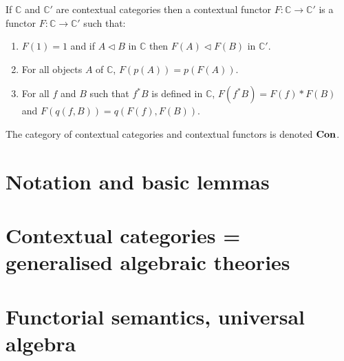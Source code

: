 \begin{definition}
  If \(\mathbb C\) and \(\mathbb C'\) are contextual categories then a contextual functor \(F:\mathbb C \rightarrow \mathbb C'\) is a functor \(F:\mathbb C \rightarrow \mathbb C'\) such that:
  \begin{enumerate}
  \item \(F(1) = 1\) and if \(A \triangleleft B\) in \(\mathbb C\) then \(F(A) \triangleleft F(B)\) in \(\mathbb C'\).
   
  \item For all objects \(A\) of \(\mathbb C\), \(F(p(A)) = p(F(A))\).
   
  \item For all \(f\) and \(B\) such that \(f^*B\) is defined in \(\mathbb C\), \(F(f^*B) = F(f) * F(B)\) and \(F(q(f,B)) = q(F(f), F(B))\).
  \end{enumerate}
\end{definition}

The category of contextual categories and contextual functors is denoted \(\mathbf{Con}\).






\section{Notation and basic lemmas} \label{sec:source-2-3}

\lipsum[16]

\section{Contextual categories = generalised algebraic theories} \label{sec:source-2-4}

\lipsum[17]

\section{Functorial semantics, universal algebra} \label{sec:source-2-5}

\lipsum[18]

